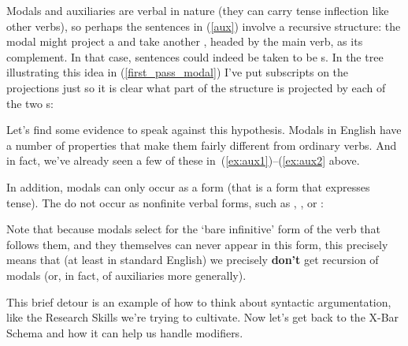 \documentclass{article}
\begin{document}
Modals and auxiliaries are verbal in nature (they can carry tense inflection like other verbs), so perhaps the sentences in (\ref{aux}) involve a recursive  structure: the modal might project a  and take another , headed by the main verb, as its complement.
In that case, sentences could indeed be taken to be s.
In the tree illustrating this idea in (\ref{first_pass_modal}) I've put subscripts on the  projections just so it is clear what part of the structure is projected by each of the two s:
\begin{exe}
    \label{first_pass_modal}
\end{exe}

Let's find some evidence to speak against this hypothesis.
Modals in English have a number of properties that make them fairly different from ordinary verbs. And in fact, we've already seen a few of these in~(\ref{ex:aux1})--(\ref{ex:aux2} above.

In addition, modals can only occur as a  form (that is a form that expresses tense). The do not occur as nonfinite verbal forms, such as , , or :
\begin{exe}
\end{exe}
Note that because modals select for the `bare infinitive' form of the verb that follows them, and they themselves can never appear in this form, this precisely means that (at least in standard English) we precisely \textbf{don't} get recursion of modals (or, in fact, of auxiliaries more generally).

This brief detour is an example of how to think about syntactic argumentation, like the Research Skills we're trying to cultivate. Now let's get back to the X-Bar Schema and how it can help us handle modifiers.
\end{document}
